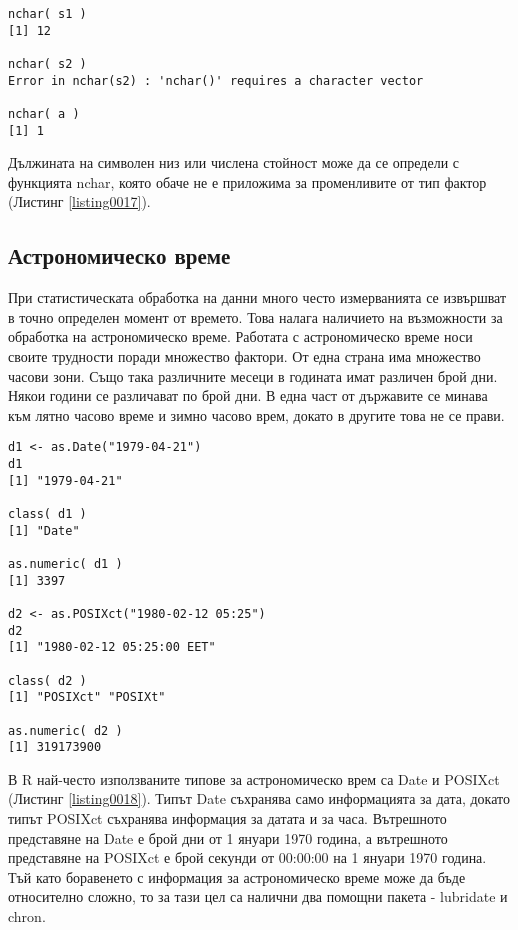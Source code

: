 \begin{lstlisting}[caption=Дължина на символен низ или числена стойност, label=listing0017]
nchar( s1 )
[1] 12

nchar( s2 )
Error in nchar(s2) : 'nchar()' requires a character vector

nchar( a )
[1] 1
\end{lstlisting}

Дължината на символен низ или числена стойност може да се определи с функцията nchar, която обаче не е приложима за променливите от тип фактор (Листинг \ref{listing0017}).

\subsection{Астрономическо време}

При статистическата обработка на данни много често измерванията се извършват в точно определен момент от времето. Това налага наличието на възможности за обработка на астрономическо време. Работата с астрономическо време носи своите трудности поради множество фактори. От една страна има множество часови зони. Също така различните месеци в годината имат различен брой дни. Някои години се различават по брой дни. В една част от държавите се минава към лятно часово време и зимно часово врем, докато в другите това не се прави.

\begin{lstlisting}[caption=Типове данни за време, label=listing0018]
d1 <- as.Date("1979-04-21")
d1
[1] "1979-04-21"

class( d1 )
[1] "Date"

as.numeric( d1 )
[1] 3397

d2 <- as.POSIXct("1980-02-12 05:25")
d2
[1] "1980-02-12 05:25:00 EET"

class( d2 )
[1] "POSIXct" "POSIXt" 

as.numeric( d2 )
[1] 319173900
\end{lstlisting}

В R най-често използваните типове за астрономическо врем са Date и POSIXct (Листинг \ref{listing0018}). Типът Date съхранява само информацията за дата, докато типът POSIXct съхранява информация за датата и за часа. Вътрешното представяне на Date е брой дни от 1 януари 1970 година, а вътрешното представяне на POSIXct е брой секунди от 00:00:00 на 1 януари 1970 година. Тъй като боравенето с информация за астрономическо време може да бъде относително сложно, то за тази цел са налични два помощни пакета - lubridate и chron.

